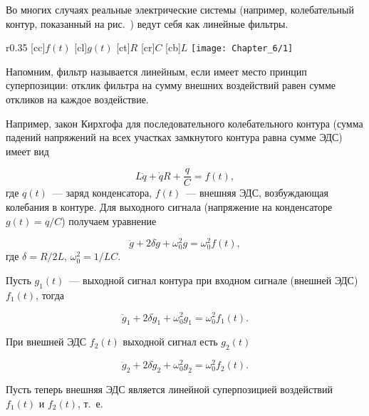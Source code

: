 



Во многих случаях реальные электрические системы (например, колебательный контур, показанный на рис.~) ведут себя как линейные фильтры.

\begin{wrapfigure}{r}{0.35\textwidth}
	[cc]{$f(t)$}
	[cl]{$g(t)$}
	[ct]{$R$}
	[cr]{$C$}
	[cb]{$L$}
	\texttt{[image: Chapter\_6/1]}
	\caption{}
\end{wrapfigure}

Напомним, фильтр называется линейным, если имеет место принцип суперпозиции: отклик фильтра на сумму внешних воздействий
равен сумме откликов на каждое воздействие.

Например, закон Кирхгофа для последовательного колебательного контура (сумма падений напряжений на всех участках
замкнутого контура равна сумме ЭДС) имеет вид

\begin{equation*}
	L\ddot{q}+\dot{q}R+\frac{q}{C}=f(t),
\end{equation*}
где $q(t)$~--- заряд конденсатора, $f(t)$~--- внешняя ЭДС, возбуждающая колебания в контуре. Для выходного сигнала
(напряжение на конденсаторе $g(t)=q/C$) получаем уравнение

\begin{equation*}
	\ddot{g}+2\delta\dot{g}+\omega_0^2 g=\omega_0^2 f(t),
\end{equation*}
где $\delta=R/2L$, $\omega_0^2=1/LC$.

Пусть $g_1(t)$~--- выходной сигнал контура при входном сигнале (внешней ЭДС) $f_1(t)$, тогда

\begin{equation*}
	\ddot{g}_1+2\delta \dot{g}_1 +\omega_0^2 g_1=\omega_0^2 f_1(t).
\end{equation*}

При внешней ЭДС $f_2(t)$ выходной сигнал есть $g_2(t)$

\begin{equation*}
	\ddot{g}_2+2\delta \dot{g}_2+\omega_0^2g_2=\omega_0^2 f_2(t).
\end{equation*}

Пусть теперь внешняя ЭДС является линейной суперпозицией воздействий $f_1(t)$ и $f_2(t)$, т.~е.

